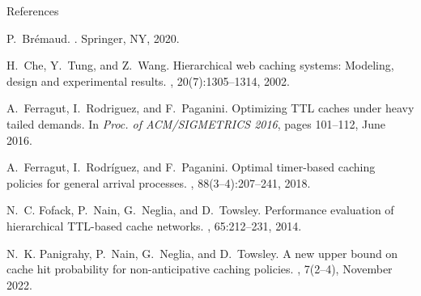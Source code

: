 \documentclass[aspectratio=169]{beamer}
\begin{document}
\begin{frame}[allowframebreaks]{References}

	\begin{thebibliography}{1}

		P.~Brémaud.
		.
		\newblock Springer, NY, 2020.
		
		H.~Che, Y.~Tung, and Z.~Wang.
		\newblock Hierarchical web caching systems: Modeling, design and experimental results.
		, 20(7):1305--1314, 2002.
		
		A.~Ferragut, I.~Rodriguez, and F.~Paganini.
		\newblock Optimizing {TTL} caches under heavy tailed demands.
		\newblock In {\em Proc. of ACM/SIGMETRICS 2016}, pages 101--112, June 2016.
		
		A.~Ferragut, I.~Rodríguez, and F.~Paganini.
		\newblock Optimal timer-based caching policies for general arrival processes.
		, 88(3--4):207--241, 2018.
		
		N.~C. Fofack, P.~Nain, G.~Neglia, and D.~Towsley.
		\newblock Performance evaluation of hierarchical {TTL}-based cache networks.
		, 65:212--231, 2014.
		
		N.~K. Panigrahy, P.~Nain, G.~Neglia, and D.~Towsley.
		\newblock A new upper bound on cache hit probability for non-anticipative caching policies.
		, 7(2--4), November 2022.
		
		\end{thebibliography}
	
		\vfill

\end{frame}
\end{document}
